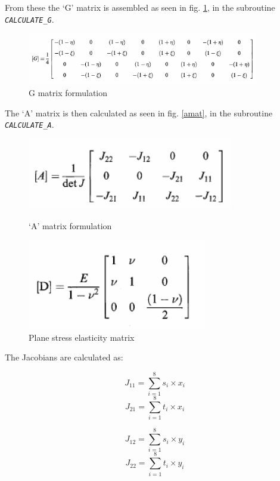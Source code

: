 \documentclass[review]{elsarticle}
\begin{document}
From these the `G' matrix is assembled as seen in fig. \ref{gmat}, in the subroutine \textit{\texttt{CALCULATE\_G}}.
\begin{figure}[ht!]
\centering
\includegraphics[width=0.9\textwidth]{gmat.png}
\caption{G matrix formulation}
\label{gmat}
\end{figure}

The `A' matrix is then calculated as seen in fig. \ref{amat}, in the subroutine \textit{\texttt{CALCULATE\_A}}.

\begin{figure}[ht!]
\begin{minipage}[b]{0.5\linewidth}
\centering
\includegraphics[width=0.8\textwidth]{amat.png}
\caption{`A' matrix formulation}
\label{amat}
\end{minipage}
\begin{minipage}[b]{0.5\linewidth}
\centering
\includegraphics[width=0.7\textwidth]{dmat.png}
\caption{Plane stress elasticity matrix}
\label{dmat}
\end{minipage}
\end{figure}

The Jacobians are calculated as:

\begin{minipage}{0.5\linewidth}
\centering
\[J_{11}=\sum_{i=1}^{8} s_i\times x_i\]
\[J_{21}=\sum_{i=1}^{8} t_i\times x_i\]
\end{minipage}
\begin{minipage}{0.5\linewidth}
\centering
\[J_{12}=\sum_{i=1}^{8} s_i\times y_i\]
\[J_{22}=\sum_{i=1}^{8} t_i\times y_i\]
\end{minipage}
\end{document}
